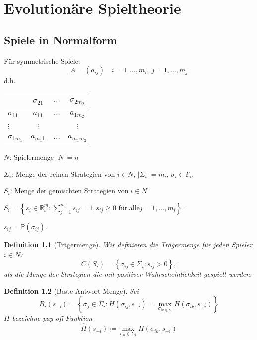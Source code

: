\documentclass[12pt]{extreport} %
\theoremstyle{named}
\theoremstyle{itshape}
\newtheorem*{definition}{Definition}
\theoremstyle{normal}
\begin{document}
\chapter{Evolutionäre Spieltheorie}

  
\section{Spiele in Normalform}
Für symmetrische Spiele:
$$ A = \left( a_{ij} \right) \quad i = 1, \dotsc, m_{i}, ~ j = 1, \dotsc, m_{j} $$
d.h.
\begin{figure*}[h!] \centering
 \begin{tabular}{l|ccc}
   ~                & $\sigma_{21}$ & $\dotsc$  & $\sigma_{2 m_{2}} $\\
  \hline
  $\sigma_{11}$     &  $a_{11}$     & $\dotsc$  & $a_{1m_{2}}$ \\
  $\vdots$          & $\vdots$      & ~         & $\vdots$ \\
  $\sigma_{1m_{1}}$ & $a_{m_{1} 1}$ & $\dotsc $ & $a_{m_{1} m_{2}}$
 \end{tabular}	
\end{figure*}

\begin{description}
	\item $N$: Spielermenge $|N| = n$
	\item $\Sigma_{i}$: Menge der reinen Strategien von $i \in N$, $\left| \Sigma_{i} \right| = m_{i}$, $\sigma_{i} \in \mathcal{E}_{i}$.
	\item $S_{i}$: Menge der gemischten Strategien von $i \in N$
		\begin{description}
			\item $S_{i} = \left\{ s_i \in \mathbb{R}^m_i : \sum_{j=1}^{m_i} s_{ij} = 1, s_{ij} \geq 0 \text{ für alle} j = 1, \dotsc, m_i \right\}$.
			\item $s_{ij} = \mathds{P}(\sigma_{ij})$.
		\end{description}
\end{description}
  
\begin{definition}[Trägermenge] Wir definieren die Trägermenge für jeden Spieler $i \in N$:
	$$ C(S_{i}) = \left\{ \sigma_{ij} \in \Sigma_{i} : s_{ij} > 0 \right\}, $$
	als die Menge der Strategien die mit positiver Wahrscheinlichkeit gespielt werden.
\end{definition}  

\begin{definition}[Beste-Antwort-Menge] Sei
	$$ B_{i}(s_{-i}) = \left\{ \sigma_{j} \in \Sigma_{i} : H(\sigma_{ij}, s_{-i}) = \max_{\sigma_{ik \in \Sigma_{i}}} H(\sigma_{ik}, s_{-i}) \right\} $$ 
	$H$ bezeichne pay-off-Funktion ~\\
	$$ \hat{H}(s_{-i}) \coloneqq \max_{\sigma_{il} \in \Sigma_{i}} H(\sigma_{ik}, s_{-i}) $$
\end{definition}
  
\end{document}
